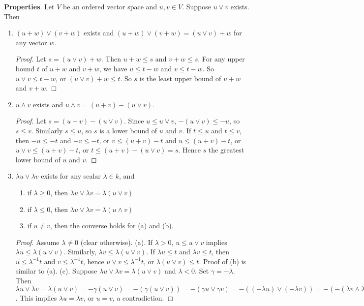\documentclass[12pt]{article}
\begin{document}
\textbf{Properties}.  
Let $V$ be an ordered vector space and $u,v\in V$.  Suppose $u\vee v$ exists.  Then
\begin{enumerate}
\item $(u+w) \vee (v+w)$ exists and $(u+w) \vee (v+w)=(u\vee v)+w$ for any vector $w$.
\begin{proof}
Let $s=(u\vee v)+w$.  Then $u+w\le s$ and $v+w\le s$.  For any upper bound $t$ of $u+w$ and $v+w$, we have $u\le t-w$ and $v\le t-w$.  So $u\vee v\le t-w$, or $(u\vee v)+w\le t$.  So $s$ is the least upper bound of $u+w$ and $v+w$.
\end{proof}
\item $u\wedge v$ exists and $u\wedge v=(u+v)-(u\vee v)$.
\begin{proof}
Let $s=(u+v)-(u\vee v)$.  Since $u\le u\vee v$, $-(u\vee v)\le -u$, so $s\le v$.  Similarly $s\le u$, so $s$ is a lower bound of $u$ and $v$.  If $t\le u$ and $t\le v$, then $-u\le -t$ and $-v \le -t$, or $v\le (u+v)-t$ and $u\le (u+v)-t$, or $u\vee v\le (u+v)-t$, or $t\le (u+v)-(u\vee v)=s$.  Hence $s$ the greatest lower bound of $u$ and $v$.
\end{proof}
\item $\lambda u\vee \lambda v$ exists for any scalar $\lambda\in k$, and 
\begin{enumerate}
\item if $\lambda\ge 0$, then $\lambda u\vee \lambda v=\lambda(u\vee v)$
\item if $\lambda\le 0$, then $\lambda u\vee \lambda v=\lambda(u\wedge v)$
\item if $u\ne v$, then the converse holds for (a) and (b).
\end{enumerate}
\begin{proof}
Assume $\lambda\ne 0$ (clear otherwise).  (a). If $\lambda >0$, $u\le u\vee v$ implies $\lambda u\le \lambda(u\vee v)$.  Similarly, $\lambda v\le \lambda(u\vee v)$.  If $\lambda u\le t$ and $\lambda v\le t$, then $u\le \lambda^{-1}t$ and $v\le \lambda^{-1}t$, hence $u\vee v\le \lambda^{-1}t$, or $\lambda(u\vee v)\le t$.  Proof of (b) is similar to (a).  (c).  Suppose $\lambda u\vee \lambda v=\lambda(u\vee v)$ and $\lambda<0$.  Set $\gamma=-\lambda$.  Then $\lambda u\vee \lambda v=\lambda (u\vee v)=-\gamma (u\vee v)=-(\gamma (u\vee v))=-(\gamma u\vee \gamma v)=-((-\lambda u)\vee (-\lambda v))=-(-(\lambda v\wedge \lambda u))=\lambda v \wedge \lambda u$.  This implies $\lambda u=\lambda v$, or $u=v$, a contradiction.
\end{proof}
\end{enumerate}
\end{document}
